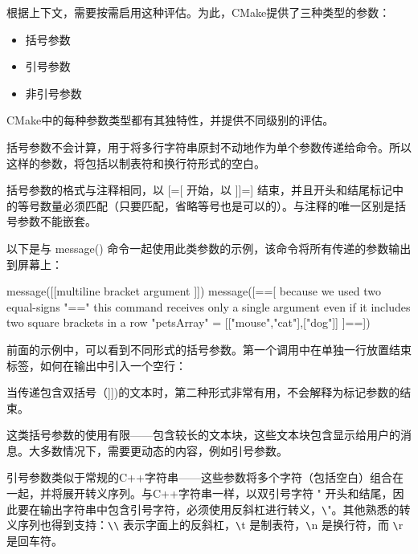 根据上下文，需要按需启用这种评估。为此，CMake提供了三种类型的参数：

\begin{itemize}
\item
括号参数

\item
引号参数

\item
非引号参数
\end{itemize}

CMake中的每种参数类型都有其独特性，并提供不同级别的评估。


括号参数不会计算，用于将多行字符串原封不动地作为单个参数传递给命令。所以这样的参数，将包括以制表符和换行符形式的空白。

括号参数的格式与注释相同，以 [=[ 开始，以 ]]=] 结束，并且开头和结尾标记中的等号数量必须匹配（只要匹配，省略等号也是可以的）。与注释的唯一区别是括号参数不能嵌套。

以下是与 message() 命令一起使用此类参数的示例，该命令将所有传递的参数输出到屏幕上：


\begin{cmake}
message([[multiline
    bracket
    argument
]])
message([==[
    because we used two equal-signs "=="
    this command receives only a single argument
    even if it includes two square brackets in a row
    { "petsArray" = [["mouse","cat"],["dog"]] }
]==])
\end{cmake}

前面的示例中，可以看到不同形式的括号参数。第一个调用中在单独一行放置结束标签，如何在输出中引入一个空行：


当传递包含双括号（]])的文本时，第二种形式非常有用，不会解释为标记参数的结束。

这类括号参数的使用有限——包含较长的文本块，这些文本块包含显示给用户的消息。大多数情况下，需要更动态的内容，例如引号参数。


引号参数类似于常规的C++字符串——这些参数将多个字符（包括空白）组合在一起，并将展开转义序列。与C++字符串一样，以双引号字符 " 开头和结尾，因此要在输出字符串中包含引号字符，必须使用反斜杠进行转义，\verb|\|"。其他熟悉的转义序列也得到支持：\verb|\\| 表示字面上的反斜杠，\verb|\|t 是制表符，\verb|\|n 是换行符，而 \verb|\|r 是回车符。

